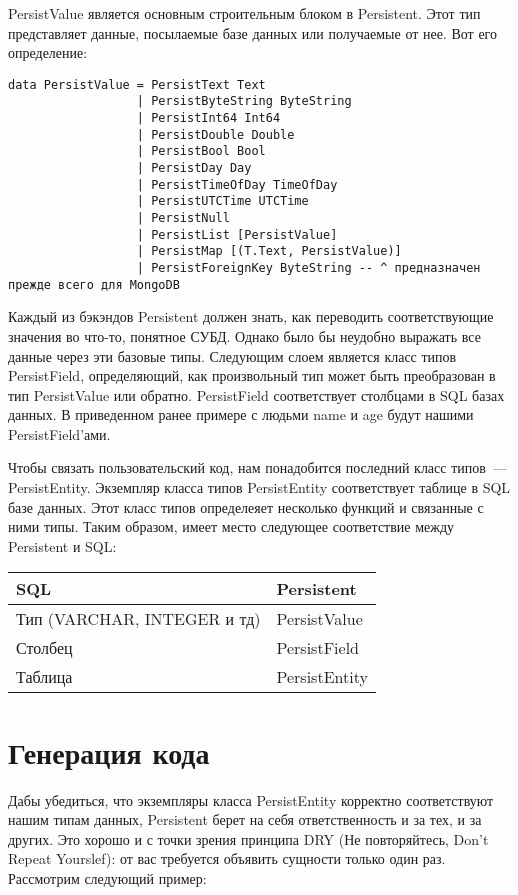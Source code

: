 PersistValue является основным строительным блоком в Persistent. Этот тип представляет данные, посылаемые базе данных или получаемые от нее. Вот его определение:

\begin{lstlisting}
data PersistValue = PersistText Text
                  | PersistByteString ByteString
                  | PersistInt64 Int64
                  | PersistDouble Double
                  | PersistBool Bool
                  | PersistDay Day
                  | PersistTimeOfDay TimeOfDay
                  | PersistUTCTime UTCTime
                  | PersistNull
                  | PersistList [PersistValue]
                  | PersistMap [(T.Text, PersistValue)]
                  | PersistForeignKey ByteString -- ^ предназначен прежде всего для MongoDB
\end{lstlisting}

Каждый из бэкэндов Persistent должен знать, как переводить соответствующие значения во что-то, понятное СУБД. Однако было бы неудобно выражать все данные через эти базовые типы. Следующим слоем является класс типов PersistField, определяющий, как произвольный тип может быть преобразован в тип PersistValue или обратно. PersistField соответствует столбцами в SQL базах данных. В приведенном ранее примере с людьми name и age будут нашими PersistField'ами.

Чтобы связать пользовательский код, нам понадобится последний класс типов~--- PersistEntity. Экземпляр класса типов PersistEntity соответствует таблице в SQL базе данных. Этот класс типов определеяет несколько функций и связанные с ними типы. Таким образом, имеет место следующее соответствие между Persistent и SQL:

\begin{center}
\begin{tabular}{ | l | l |}
\hline
SQL	& Persistent \\ \hline
Тип (VARCHAR, INTEGER и тд)	& PersistValue \\ \hline
Столбец & PersistField \\ \hline
Таблица	& PersistEntity \\ \hline
\end{tabular}
\end{center}

\section{Генерация кода} %

Дабы убедиться, что экземпляры класса PersistEntity корректно соответствуют нашим типам данных, Persistent берет на себя ответственность и за тех, и за других. Это хорошо и с точки зрения принципа DRY (Не повторяйтесь, Don't Repeat Yourslef): от вас требуется объявить сущности только один раз. Рассмотрим следующий пример:

